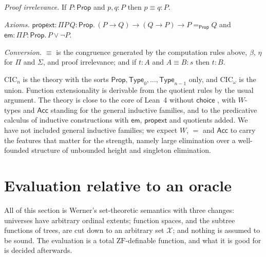 \documentclass[10pt]{article}
\newcommand{\Prop}{\mathsf{Prop}}
\newcommand{\Type}{\mathsf{Type}}
\newcommand{\CIC}{\mathrm{CIC}}
\newcommand{\ZF}{\mathrm{ZF}}
\newcommand{\X}{\mathcal{X}}
\newcommand{\Acc}{\mathsf{Acc}}
\begin{document}
\emph{Proof irrelevance.} If $P:\Prop$ and $p,q:P$ then $p\equiv q:P$.

\emph{Axioms.} $\mathsf{propext}:\Pi P\,Q{:}\Prop.\,(P\to Q)\to(Q\to P)\to P=_\Prop Q$
and $\mathsf{em}:\Pi P{:}\Prop.\,P\vee\neg P$.

\emph{Conversion.} $\equiv$ is the congruence generated by the
computation rules above, $\beta$, $\eta$ for $\Pi$ and $\Sigma$, and
proof irrelevance; and if $t:A$ and $A\equiv B:s$ then $t:B$.

$\CIC_n$ is the theory with the sorts $\Prop,\Type_0,\dots,\Type_{n-1}$
only, and $\CIC_\omega$ is the union. Function extensionality is
derivable from the quotient rules by the usual argument. The theory is
close to the core of Lean~4 without $\mathsf{choice}$ \cite{carneiro19},
with $W$-types and $\Acc$ standing for the general inductive families,
and to the predicative calculus of inductive constructions with
$\mathsf{em}$, $\mathsf{propext}$ and quotients added. We have not
included general inductive families; we expect $W$, $=$ and $\Acc$ to
carry the features that matter for the strength, namely large
elimination over a well-founded structure of unbounded height and
singleton elimination.

\section{Evaluation relative to an oracle}\label{sec:sem}

All of this section is Werner's set-theoretic semantics \cite{werner97}
with three changes: universes have arbitrary ordinal extents; function
spaces, and the subtree functions of trees, are cut down to an arbitrary
set $\X$; and nothing is assumed to be sound. The evaluation is a total
$\ZF$-definable function, and what it is good for is decided afterwards.
\end{document}
